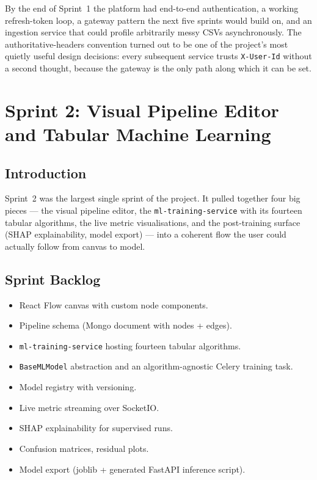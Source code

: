 \documentclass[12pt, a4paper]{report}
\begin{document}
By the end of Sprint~1 the platform had end-to-end authentication, a
working refresh-token loop, a gateway pattern the next five sprints
would build on, and an ingestion service that could profile
arbitrarily messy CSVs asynchronously. The
authoritative-headers convention turned out to be one of the
project's most quietly useful design decisions: every subsequent
service trusts \texttt{X-User-Id} without a second thought, because
the gateway is the only path along which it can be set.

\chapter{Sprint 2: Visual Pipeline Editor and Tabular Machine Learning}

\section*{Introduction}

Sprint~2 was the largest single sprint of the project. It pulled
together four big pieces --- the visual pipeline editor, the
\texttt{ml-training-service} with its fourteen tabular algorithms,
the live metric visualisations, and the post-training surface (SHAP
explainability, model export) --- into a coherent flow the user
could actually follow from canvas to model.

\section{Sprint Backlog}

\begin{itemize}
    \item React Flow canvas with custom node components.
    \item Pipeline schema (Mongo document with nodes + edges).
    \item \texttt{ml-training-service} hosting fourteen tabular
        algorithms.
    \item \texttt{BaseMLModel} abstraction and an algorithm-agnostic
        Celery training task.
    \item Model registry with versioning.
    \item Live metric streaming over SocketIO.
    \item SHAP explainability for supervised runs.
    \item Confusion matrices, residual plots.
    \item Model export (joblib + generated FastAPI inference script).
\end{itemize}
\end{document}
